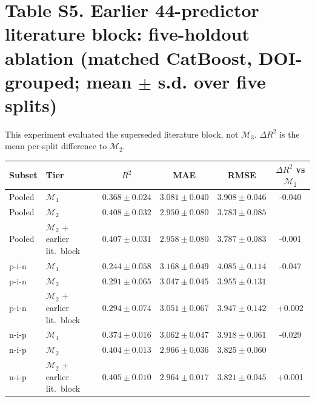 \documentclass[10pt]{article}
\begin{document}
\section*{Table S5. Earlier 44-predictor literature block: five-holdout ablation (matched CatBoost, DOI-grouped; mean $\pm$ s.d. over five splits)}
This experiment evaluated the superseded literature block, not $\mathcal{M}_3$. $\Delta R^2$ is the mean per-split difference to $\mathcal{M}_2$.\par\smallskip\begin{tabular}{llcccc}\toprule Subset & Tier & $R^2$ & MAE & RMSE & $\Delta R^2$ vs $\mathcal{M}_2$\\\midrule
Pooled & $\mathcal{M}_1$ & $0.368\pm0.024$ & $3.081\pm0.040$ & $3.908\pm0.046$ & -0.040\\
Pooled & $\mathcal{M}_2$ & $0.408\pm0.032$ & $2.950\pm0.080$ & $3.783\pm0.085$ & \\
Pooled & $\mathcal{M}_2$ + earlier lit.\ block & $0.407\pm0.031$ & $2.958\pm0.080$ & $3.787\pm0.083$ & -0.001\\
\midrule
p-i-n & $\mathcal{M}_1$ & $0.244\pm0.058$ & $3.168\pm0.049$ & $4.085\pm0.114$ & -0.047\\
p-i-n & $\mathcal{M}_2$ & $0.291\pm0.065$ & $3.047\pm0.045$ & $3.955\pm0.131$ & \\
p-i-n & $\mathcal{M}_2$ + earlier lit.\ block & $0.294\pm0.074$ & $3.051\pm0.067$ & $3.947\pm0.142$ & +0.002\\
\midrule
n-i-p & $\mathcal{M}_1$ & $0.374\pm0.016$ & $3.062\pm0.047$ & $3.918\pm0.061$ & -0.029\\
n-i-p & $\mathcal{M}_2$ & $0.404\pm0.013$ & $2.966\pm0.036$ & $3.825\pm0.060$ & \\
n-i-p & $\mathcal{M}_2$ + earlier lit.\ block & $0.405\pm0.010$ & $2.964\pm0.017$ & $3.821\pm0.045$ & +0.001\\
\midrule
\bottomrule\end{tabular}\par\medskip
\end{document}
